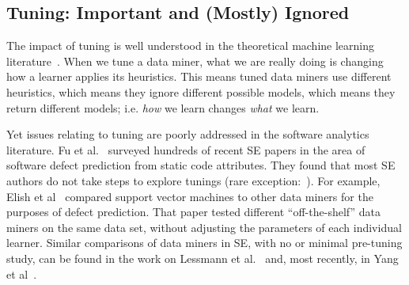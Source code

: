 \documentclass[twocolumn,5p,sort&compress]{elsarticle}
\theoremstyle{break}
\begin{document}




\subsection{Tuning: Important and (Mostly) Ignored}
\label{sect:tune}

The impact of tuning is well understood in the theoretical machine learning literature~\cite{bergstra2012random}.  When we tune a
data miner, what we are really doing is changing how a learner applies its
heuristics. This means tuned data miners use different heuristics, which means
they ignore different possible models, which means they return different models;
i.e. \textit{how} we learn changes \textit{what} we learn.

Yet issues relating to
tuning are poorly addressed in the software analytics literature.  Fu et al.~\cite{fu2016tuning} surveyed hundreds of recent SE papers in the area
of software defect prediction from static code attributes. They found that most SE
  authors do not take steps to explore tunings (rare exception:~\cite{tantithamthavorn2016icse}). For example, Elish et
  al~\cite{elish2008predicting} compared support vector machines to other data
  miners for the purposes of defect prediction. That paper tested different
  ``off-the-shelf'' data miners on the same data set, without adjusting the
  parameters of each individual learner. Similar comparisons of data miners in SE,
with no or minimal pre-tuning study, can be found in the work on Lessmann et al.~\cite{4527256}
and, most recently, in Yang et al~\cite{Yang:2016}.  
\end{document}
